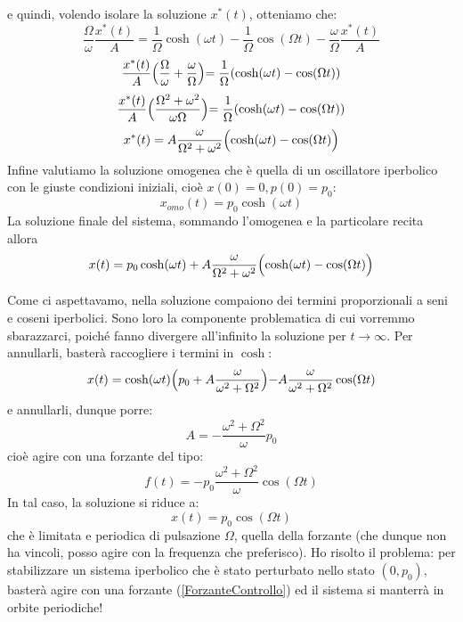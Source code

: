 \documentclass[a4paper,openany]{article}
\begin{document}
	e quindi, volendo isolare la soluzione $x^{*}(t)$, otteniamo che:
	\begin{equation}\label{key}
		\dfrac{\Omega}{\omega} \dfrac{x^{*}(t)}{A} = \dfrac{1}{\Omega}\cosh(\omega t) - \dfrac{1}{\Omega}\cos(\Omega t) - \dfrac{\omega}{\Omega} \dfrac{x^{*}(t)}{A}
	\end{equation}
	\begin{equation}\label{key}
		\dfrac{x^{*}(t)}{A} \Bigl(\dfrac{\Omega}{\omega} + \dfrac{\omega}{\Omega}\Bigl)=\dfrac{1}{\Omega}(\cosh(\omega t)-\cos(\Omega t))
	\end{equation}
	\begin{equation}\label{key}
		\dfrac{x^{*}(t)}{A} \Bigl(\dfrac{\Omega^2+\omega^2}{\omega \Omega}\Bigl)=\dfrac{1}{\Omega}(\cosh(\omega t)-\cos(\Omega t))
	\end{equation}
	\begin{equation}\label{key}
		x^{*}(t)= A \dfrac{\omega }{\Omega^2+\omega^2}\Bigl(\cosh(\omega t) - \cos(\Omega t)\Bigl)
	\end{equation}
	Infine valutiamo la soluzione omogenea che è quella di un oscillatore iperbolico con le giuste condizioni iniziali, cioè $x(0)= 0, p(0) = p_0$:
	\begin{equation}\label{key}
		x_{omo}(t) = p_0 \cosh(\omega t)
	\end{equation}
	La soluzione finale del sistema, sommando l'omogenea e la particolare recita allora
	\begin{equation}
		x(t) = p_{0}\cosh(\omega t) + A \dfrac{\omega }{\Omega^2+\omega^2}\Bigl(\cosh(\omega t) - \cos(\Omega t)\Bigl)
	\end{equation}
	
	Come ci aspettavamo, nella soluzione compaiono dei termini proporzionali a seni e coseni iperbolici. Sono loro la componente problematica di cui vorremmo sbarazzarci, poiché fanno divergere all'infinito la soluzione per $t\to\infty$. Per annullarli, basterà raccogliere i termini in $\cosh$:
	\begin{equation}\label{key}
		x(t) = \cosh(\omega t)\Bigl(p_0+ A \dfrac{\omega}{\omega^2+\Omega^2}\Bigl) - A\dfrac{\omega}{\omega^2+\Omega^2}\cos(\Omega t)
	\end{equation}
	e annullarli, dunque porre:
	$$
	A = -\dfrac{\omega^{2} + \Omega^{2}}{\omega}p_{0}
	$$
	cioè agire con una forzante del tipo:
	\begin{equation}
		f(t) = -p_{0}\dfrac{\omega^{2} + \Omega^{2}}{\omega} \cos(\Omega t)
		\label{ForzanteControllo}
	\end{equation}
	In tal caso, la soluzione si riduce a:
	\begin{equation}
		x(t) = p_0\cos(\Omega t)
	\end{equation}
	che è limitata e periodica di pulsazione $\Omega$, quella della forzante (che dunque non ha vincoli, posso agire con la frequenza che preferisco). Ho risolto il problema: per stabilizzare un sistema iperbolico che è stato perturbato nello stato $(0,p_{0})$, basterà agire con una forzante (\ref{ForzanteControllo}) ed il sistema si manterrà in orbite periodiche!
	
\end{document}
